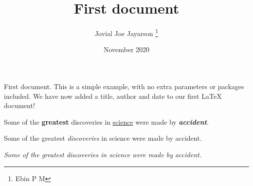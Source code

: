 \documentclass[12pt, a4paper]{article}
\title{First document}
\author{Jovial Joe Jayarson \thanks{Ebin P M}}
\date{November 2020}
\begin{document}
\maketitle %

First document. This is a simple example, with no extra parameters or packages included. We have now added a title, author and date to our first \LaTeX{} document!


Some of the \textbf{greatest} discoveries in \underline{science} were made by \textbf{\textit{accident}}. %

Some of the greatest \emph{discoveries} in science were made by accident.

\textit{Some of the greatest \emph{discoveries} in science were made by accident.}
\end{document}
